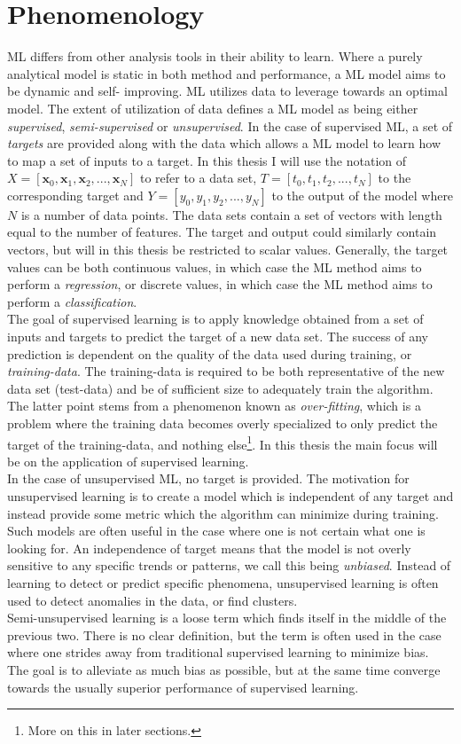 \section{Phenomenology}\label{sec:MLPhen}
\ac{ML} differs from other analysis tools in their ability to learn. 
Where a purely analytical model is static in both method 
and performance, a \ac{ML} model aims to be dynamic and self- improving. 
\ac{ML} utilizes data to leverage towards an optimal
model. The extent of utilization of data defines a \ac{ML} model as being
either \emph{supervised}, \emph{semi-supervised} or \emph{unsupervised}. In the case 
of supervised \ac{ML}, a set of \emph{targets} are provided along with the
data which allows a \ac{ML} model to learn how to map a set of inputs to a target. In this 
thesis I will use the notation of $X = [\textbf{x}_0,\textbf{x}_1,\textbf{x}_2,...,\textbf{x}_N]$ to refer to 
a data set, $T = [t_0,t_1,t_2,...,t_N]$ to the corresponding target and $Y=[y_0,y_1,y_2,...,y_N]$ 
to the output of the model where $N$ is a number of data points. The data sets contain a set of vectors with length equal to the number 
of features. The target and output could similarly contain vectors, but will in this thesis be restricted 
to scalar values. Generally, the target values can be both continuous values, in which case the \ac{ML} 
method aims to perform a \emph{regression}, or discrete values, in which case the \ac{ML} method aims 
to perform a \emph{classification}. 
\\
The goal of supervised learning is to apply knowledge obtained from 
a set of inputs and targets to predict the target of a new data set. 
The success of any prediction is dependent on the quality of the 
data used during training, or \emph{training-data}. The training-data is required to 
be both representative of the new data set (test-data) and be of sufficient size to 
adequately train the algorithm. The latter point stems from a phenomenon known as \emph{over-fitting},
which is a problem where the training data becomes overly specialized to only predict 
the target of the training-data, and nothing else\footnote{More on this in later sections.}.
In this thesis the main focus will be on the application of supervised learning.
\\
In the case of unsupervised \ac{ML}, no target is provided. The motivation for unsupervised
learning is to create a model which is independent of any target and instead provide some metric 
which the algorithm can minimize during training. Such models are often useful in the case where 
one is not certain what one is looking for. An independence of target means that the model 
is not overly sensitive to any specific trends or patterns, we call
this being \emph{unbiased}. Instead of learning to detect or predict specific phenomena,
unsupervised learning is often used to detect anomalies in the data, or find clusters.
\\
Semi-unsupervised learning is a loose term which finds itself in the middle of the previous two. 
There is no clear definition, but the term is often used in the case where one strides away from 
traditional supervised learning to minimize bias. The goal is to alleviate as much bias as possible, 
but at the same time converge towards the usually superior performance of supervised learning.  